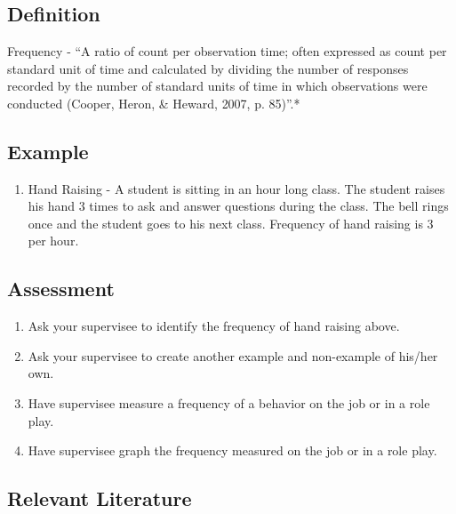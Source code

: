 \chapter{\fouraOne{}}
%
\section{Definition}
Frequency - ``A ratio of count per observation time; often expressed as count per standard unit of time and calculated by dividing the number of responses recorded by the number of standard units of time in which observations were conducted (Cooper, Heron, \& Heward, 2007, p. 85)''.*
%
\section{Example}
\begin{enumerate}
\item Hand Raising - A student is sitting in an hour long class. The student raises his hand 3 times to ask and answer questions during the class. The bell rings once and the student goes to his next class. Frequency of hand raising is 3 per hour.
\end{enumerate}
% 
\section{Assessment} 
\begin{enumerate}
\item Ask your supervisee to identify the frequency of hand raising above.
\item Ask your supervisee to create another example and non-example of his/her own.
\item Have supervisee measure a frequency of a behavior on the job or in a role play.
\item Have supervisee graph the frequency measured on the job or in a role play.
\end{enumerate}

\section{Relevant Literature}
\begin{refsection}
\nocite{test,alang2017police,clayton2018black}
\printbibliography[heading=none]
\end{refsection}

